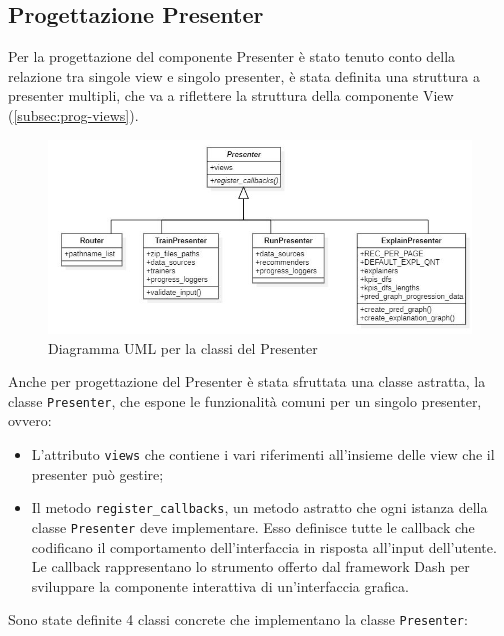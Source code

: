 \subsection{Progettazione Presenter}
Per la progettazione del componente Presenter è stato tenuto conto della relazione tra singole view e singolo presenter, è stata definita una struttura a presenter multipli, che va a riflettere la struttura della componente View (\autoref{subsec:prog-views}).


\begin{figure}[H] 
    \centering 
    \includegraphics[width=0.8\columnwidth]{immagini/uml-presenters.jpg} 
    \caption{Diagramma UML per la classi del Presenter}
    \label{fig:uml-presenters}
\end{figure}


Anche per progettazione del Presenter è stata sfruttata una classe astratta, la classe \texttt{Presenter}, che espone le funzionalità comuni per un singolo presenter, ovvero: 

\begin{itemize}

\item L'attributo \texttt{views} che contiene i vari riferimenti all'insieme delle view che il presenter può gestire;

\item Il metodo \texttt{register\_callbacks}, un metodo astratto che ogni istanza della classe \texttt{Presenter} deve implementare. Esso definisce tutte le callback che codificano il comportamento dell'interfaccia in risposta all'input dell'utente. Le callback rappresentano lo strumento offerto dal framework Dash per sviluppare la componente interattiva di un'interfaccia grafica.

\end{itemize}

Sono state definite 4 classi concrete che implementano la classe \texttt{Presenter}:


